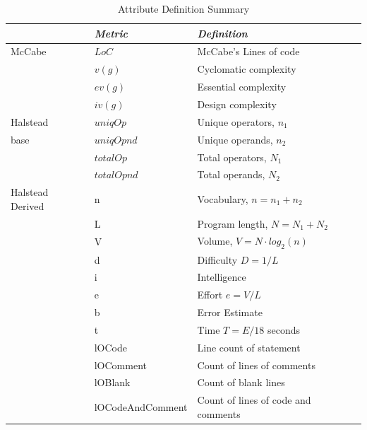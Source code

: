 \documentclass[]{book}
\theoremstyle{definition}
\theoremstyle{definition}
\theoremstyle{remark}
\begin{document}
\citep{mccabe76}

\citep{Halstead77}

\begin{table}%
\small
\caption{Attribute Definition Summary}
\label{tab:attrDef}
\begin{center}
\begin{small}
\begin{tabular}{l|l|p{6cm}}
\hline
       & \emph{Metric} &  \emph{Definition} \\
\hline
\hline
    McCabe  &          $LoC$  &  McCabe's  Lines of code \\
\hline
            &       $v(g)$  &  Cyclomatic complexity \\
            &       $ev(g)$  &  Essential complexity \\
            &       $iv(g)$  &  Design complexity \\
\hline
Halstead   &     $uniqOp$  &  Unique operators, $n_1$ \\
base               &   $uniqOpnd$  &  Unique operands, $n_2$ \\
               &    $totalOp$  &  Total operators, $N_1$ \\
               &   $totalOpnd$  &  Total operands, $N_2$\\
\hline
Halstead Derived  &           n  &  Vocabulary, $n=n_1+n_2$  \\
                  &           L  &  Program length, $N = N_1 + N_2$ \\%
                  &           V  &  Volume, $V = N\cdot log_2(n)$ \\ %
                  &           d  &  Difficulty $D=1/L$\\
                  &           i  &  Intelligence \\
                  &           e  &  Effort $e=V/L$ \\ %
                  &           b  &  Error Estimate \\
                  &           t  &  Time $T = E / 18$ seconds\\
                  &      lOCode  &  Line count of statement \\
                  & lOComment   &  Count of lines of comments \\
                  & lOBlank     &  Count of blank lines \\
                  & lOCodeAndComment  &  Count of lines of code and comments           \\


\end{tabular}
\end{small}
\end{center}
\end{table}
\end{document}

